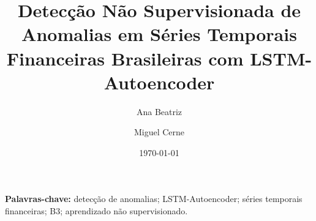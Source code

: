 \documentclass[11pt,a4paper]{article}
\title{\textbf{Detecção Não Supervisionada de Anomalias em Séries Temporais
Financeiras Brasileiras com LSTM-Autoencoder}}
\author[ ]{Ana Beatriz}
\author[ ]{Miguel Cerne}
\affil[ ]{Redes Neurais (2026.1)}
\date{\today}
\begin{document}
\maketitle

\begin{abstract}

\end{abstract}

\noindent\textbf{Palavras-chave:} detecção de anomalias; LSTM-Autoencoder;
séries temporais financeiras; B3; aprendizado não supervisionado.

\tableofcontents




















\end{document}

